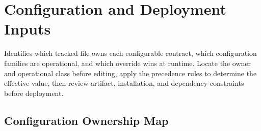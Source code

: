 \chapter{Configuration and Deployment Inputs}
\label{ch:configuration}

\chapteroverview
  {Identifies which tracked file owns each configurable contract, which
   configuration families are operational, and which override wins at runtime.}
  {Locate the owner and operational class before editing, apply the precedence
   rules to determine the effective value, then review artifact, installation,
   and dependency constraints before deployment.}

\section{Configuration Ownership Map}

